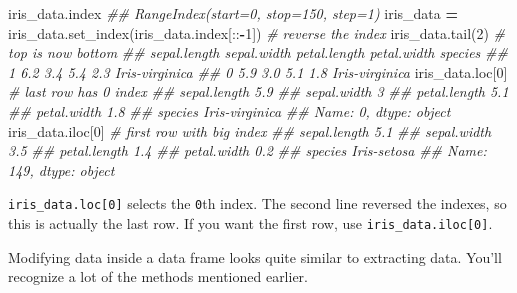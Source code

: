 \documentclass[
  12pt,
]{krantz}
\makeatletter
\newenvironment{Shaded}{\begin{snugshade}}{\end{snugshade}}
\newcommand{\CommentTok}[1]{\textcolor[rgb]{0.37,0.37,0.37}{\textit{#1}}}
\newcommand{\DecValTok}[1]{\textcolor[rgb]{0.06,0.06,0.06}{#1}}
\newcommand{\NormalTok}[1]{#1}
\newcommand{\OperatorTok}[1]{\textcolor[rgb]{0.43,0.43,0.43}{\textbf{#1}}}
\newenvironment{kframe}{%
\medskip{}
\setlength{\fboxsep}{.8em}
 \def\at@end@of@kframe{}%
 \ifinner\ifhmode%
  \def\at@end@of@kframe{\end{minipage}}%
  \begin{minipage}{\columnwidth}%
 \fi\fi%
 \def\FrameCommand##1{\hskip\@totalleftmargin \hskip-\fboxsep
 \colorbox{shadecolor}{##1}\hskip-\fboxsep
     \hskip-\linewidth \hskip-\@totalleftmargin \hskip\columnwidth}%
 \MakeFramed {\advance\hsize-\width
   \@totalleftmargin\z@ \linewidth\hsize
   \@setminipage}}%
 {\par\unskip\endMakeFramed%
 \at@end@of@kframe}
\renewenvironment{Shaded}{\begin{kframe}}{\end{kframe}}
\makeatother
\begin{document}
\begin{Shaded}
\begin{Highlighting}[]
\NormalTok{iris\_data.index}
\CommentTok{\#\# RangeIndex(start=0, stop=150, step=1)}
\NormalTok{iris\_data }\OperatorTok{=}\NormalTok{ iris\_data.set\_index(iris\_data.index[::}\OperatorTok{{-}}\DecValTok{1}\NormalTok{]) }\CommentTok{\# reverse the index}
\NormalTok{iris\_data.tail(}\DecValTok{2}\NormalTok{) }\CommentTok{\# top is now bottom}
\CommentTok{\#\#    sepal.length  sepal.width  petal.length  petal.width         species}
\CommentTok{\#\# 1           6.2          3.4           5.4          2.3  Iris{-}virginica}
\CommentTok{\#\# 0           5.9          3.0           5.1          1.8  Iris{-}virginica}
\NormalTok{iris\_data.loc[}\DecValTok{0}\NormalTok{] }\CommentTok{\# last row has 0 index}
\CommentTok{\#\# sepal.length               5.9}
\CommentTok{\#\# sepal.width                  3}
\CommentTok{\#\# petal.length               5.1}
\CommentTok{\#\# petal.width                1.8}
\CommentTok{\#\# species         Iris{-}virginica}
\CommentTok{\#\# Name: 0, dtype: object}
\NormalTok{iris\_data.iloc[}\DecValTok{0}\NormalTok{] }\CommentTok{\# first row with big index }
\CommentTok{\#\# sepal.length            5.1}
\CommentTok{\#\# sepal.width             3.5}
\CommentTok{\#\# petal.length            1.4}
\CommentTok{\#\# petal.width             0.2}
\CommentTok{\#\# species         Iris{-}setosa}
\CommentTok{\#\# Name: 149, dtype: object}
\end{Highlighting}
\end{Shaded}

\texttt{iris\_data.loc{[}0{]}} selects the \texttt{0}th index. The second line reversed the indexes, so this is actually the last row. If you want the first row, use \texttt{iris\_data.iloc{[}0{]}}.

Modifying data inside a data frame looks quite similar to extracting data. You'll recognize a lot of the methods mentioned earlier.
\end{document}
